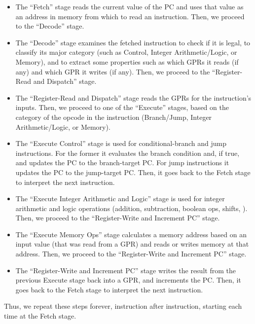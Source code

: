 \begin{itemize}

\item The ``Fetch'' stage reads the current value of the PC and uses
  that value as an address in memory from which to read an
  instruction.  Then, we proceed to the ``Decode'' stage.

\item The ``Decode'' stage examines the fetched instruction to check
  if it is legal, to classify its major category (such as Control,
  Integer Arithmetic/Logic, or Memory), and to extract some properties
  such as which GPRs it reads (if any) and which GPR it writes (if
  any).  Then, we proceed to the ``Register-Read and Dispatch'' stage.

\item The ``Register-Read and Dispatch'' stage reads the GPRs for the
instruction's inputs.  Then, we proceed to one of the ``Execute''
stages, based on the category of the opcode in the instruction
(Branch/Jump, Integer Arithmetic/Logic, or Memory).

\item The ``Execute Control'' stage is used for conditional-branch and
jump instructions.  For the former it evaluates the branch condition
and, if true, and updates the PC to the branch-target PC.  For jump
instructions it updates the PC to the jump-target PC. Then, it goes
back to the Fetch stage to interpret the next instruction.

\item The ``Execute Integer Arithmetic and Logic'' stage is used for
integer arithmetic and logic operations (addition, subtraction,
boolean ops, shifts, {\etc}).  Then, we proceed to the
``Register-Write and Increment PC'' stage.

\item The ``Execute Memory Ops'' stage calculates a memory address
based on an input value (that was read from a GPR) and reads or writes
memory at that address.  Then, we proceed to the ``Register-Write and
Increment PC'' stage.

\item The ``Register-Write and Increment PC'' stage writes the result
from the previous Execute stage back into a GPR, and increments the
PC.  Then, it goes back to the Fetch stage to interpret the next
instruction.

\end{itemize}

Thus, we repeat these steps forever, instruction after instruction,
starting each time at the Fetch stage.

